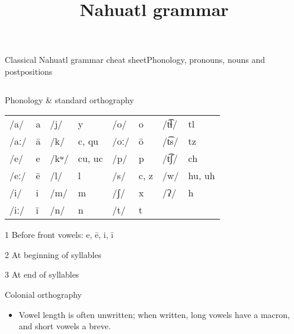 \documentclass[12pt]{beamer}
\title{Nahuatl grammar}
\newcommand{\nah}[1]{\textcolor{nahgrn}{#1}}
\begin{document}
\begin{frame}%
  {Classical Nahuatl grammar cheat sheet}{Phonology, pronouns, nouns and postpositions}
  \begin{columns}[t]
    \begin{column}{.23\linewidth}
      \begin{block}{Phonology \& standard orthography}
        \begin{threeparttable}
          \begin{tabular}{l@{\,}l@{\qquad}l@{\,}l@{\qquad}l@{\,}l@{\qquad}l@{\,}l}
            /a/  & \nah{a} & /j/  & \nah{y}                              & /o/  & \nah{o}                   & /t͡ɬ/ & \nah{tl}                             \\
            /aː/ & \nah{ā} & /k/  & \nah{c}, \nah{qu}\tnote{1}           & /oː/ & \nah{ō}                   & /t͡s/ & \nah{tz}                             \\
            /e/  & \nah{e} & /kʷ/ & \nah{cu}\tnote{2}, \nah{uc}\tnote{3} & /p/  & \nah{p}                   & /t͡ʃ/ & \nah{ch}                             \\
            /eː/ & \nah{ē} & /l/  & \nah{l}                              & /s/  & \nah{c}\tnote{1}, \nah{z} & /w/  & \nah{hu}\tnote{2}, \nah{uh}\tnote{3} \\
            /i/  & \nah{i} & /m/  & \nah{m}                              & /ʃ/  & \nah{x}                   & /ʔ/  & \nah{h}                              \\
            /iː/ & \nah{ī} & /n/  & \nah{n}                              & /t/  & \nah{t}                   &      &
          \end{tabular}
          \begin{tablenotes}
            \item[1] Before front vowels: \nah{e, ē, i, ī}
            \item[2] At beginning of syllables
            \item[3] At end of syllables
          \end{tablenotes}
        \end{threeparttable}
      \end{block}
      \begin{block}{Colonial orthography}
        \begin{itemize}
          \item Vowel length is often unwritten; when written, long vowels have a macron, and short vowels a breve.
                \begin{itemize}

\end{itemize}
\end{itemize}
\end{block}
\end{column}
\end{columns}
\end{frame}
\end{document}
